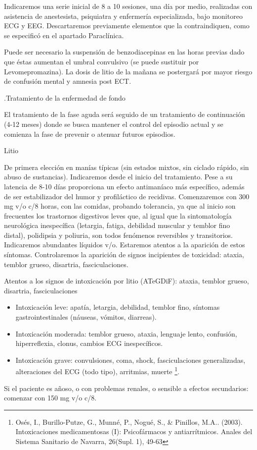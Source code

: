 Indicaremos una serie inicial de 8 a 10 sesiones, una día por medio, realizadas con asistencia de anestesista, psiquiatra y enfermería especializada, bajo monitoreo ECG y EEG. Descartaremos previamente elementos que la contraindiquen, como se especificó en el apartado Paraclínica.

Puede ser necesario la suspensión de benzodiacepinas en las horas previas dado que éstas aumentan el umbral convulsivo (se puede sustituir por Levomepromazina). La dosis de litio de la mañana se postergará por mayor riesgo de confusión mental y amnesia post ECT.

.Tratamiento de la enfermedad de fondo

El tratamiento de la fase aguda será seguido de un tratamiento de continuación (4-12 meses) donde se busca mantener el control del episodio actual y se comienza la fase de prevenir o atenuar futuros episodios.

\faPills Litio

De primera elección en manías típicas (sin estados mixtos, sin ciclado rápido, sin abuso de sustancias). Indicaremos desde el inicio del tratamiento. Pese a su latencia de 8-10 días proporciona un efecto antimaníaco más específico, además de ser estabilizador del humor y profiláctico de recidivas. Comenzaremos con 300 mg v/o c/8 horas, con las comidas, probando tolerancia, ya que al inicio son frecuentes los trastornos digestivos leves que, al igual que la sintomatología neurológica inespecífica (letargia, fatiga, debilidad muscular y temblor fino distal), polidipsia y poliuria, son todos fenómenos reversibles y transitorios. Indicaremos abundantes líquidos v/o. Estaremos atentos a la aparición de estos síntomas. Controlaremos la aparición de signos incipientes de toxicidad: ataxia, temblor grueso, disartria, fasciculaciones.

\faRadiation Atentos a los signos de intoxicación por litio (ATeGDiF): ataxia, temblor grueso, disartria, fasciculaciones
\begin{itemize}
	\item Intoxicación leve: apatía, letargia, debilidad, temblor fino, síntomas gastrointestinales (náuseas, vómitos, diarreas).
	\item Intoxicación moderada: temblor grueso, ataxia, lenguaje lento, confusión, hiperreflexia, clonus, cambios ECG inespecíficos.
	\item Intoxicación grave: convulsiones, coma, shock, fasciculaciones generalizadas, alteraciones del ECG (todo tipo), arritmias, muerte \footnote{Osés, I., Burillo-Putze, G., Munné, P., Nogué, S., \& Pinillos, M.A.. (2003). Intoxicaciones medicamentosas (I): Psicofármacos y antiarrítmicos. Anales del Sistema Sanitario de Navarra, 26(Supl. 1), 49-63}.
\end{itemize}
Si el paciente es añoso, o con problemas renales, o sensible a efectos secundarios: comenzar con 150 mg v/o c/8.

